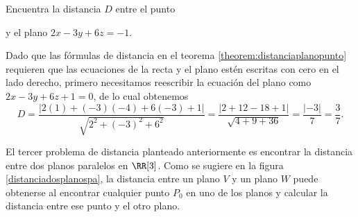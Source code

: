 \begin{examplebox}{}{}
    Encuentra la distancia $D$ entre el punto
    \begin{matrizn}
    \end{matrizn}
    y el plano $2x - 3y + 6z = -1$.

    \tcblower
    \solucion Dado que las fórmulas de distancia en el teorema \ref{theorem:distanciaplanopunto} requieren que las ecuaciones de la recta y el plano estén escritas con cero en el lado derecho, primero necesitamos reescribir la ecuación del plano como $2x - 3y + 6z + 1 = 0$, de lo cual obtenemos
    $$D = \frac{|2(1) + (-3)(-4) + 6(-3) + 1|}{\sqrt{2^2 + (-3)^2 + 6^2}} = \frac{|2 + 12 - 18 + 1|}{\sqrt{4 + 9 + 36}} = \frac{|-3|}{7} = \frac{3}{7}.$$
\end{examplebox}

El tercer problema de distancia planteado anteriormente es encontrar la distancia entre dos planos paralelos en $\RR[3]$. Como se sugiere en la figura \ref{distanciadosplanospa}, la distancia entre un plano $V$ y un plano $W$ puede obtenerse al encontrar cualquier punto $P_0$ en uno de los planos y calcular la distancia entre ese punto y el otro plano.

